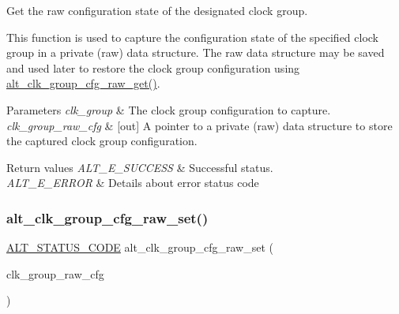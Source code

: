 Get the raw configuration state of the designated clock group.

This function is used to capture the configuration state of the specified clock group in a private (raw) data structure. The raw data structure may be saved and used later to restore the clock group configuration using \mbox{\hyperlink{group__CLK__MGR__GROUP__CFG_ga8bcf8cd04e2eddface10a7a0dd6f7b3d}{alt\+\_\+clk\+\_\+group\+\_\+cfg\+\_\+raw\+\_\+get()}}.


\begin{DoxyParams}{Parameters}
{\em clk\+\_\+group} & The clock group configuration to capture.\\
\hline
{\em clk\+\_\+group\+\_\+raw\+\_\+cfg} & \mbox{[}out\mbox{]} A pointer to a private (raw) data structure to store the captured clock group configuration.\\
\hline
\end{DoxyParams}

\begin{DoxyRetVals}{Return values}
{\em A\+L\+T\+\_\+\+E\+\_\+\+S\+U\+C\+C\+E\+SS} & Successful status. \\
\hline
{\em A\+L\+T\+\_\+\+E\+\_\+\+E\+R\+R\+OR} & Details about error status code \\
\hline
\end{DoxyRetVals}
\mbox{\label{group__CLK__MGR__GROUP__CFG_ga760bdf4144b1cab6a00c712268c29ef0}} 
\subsubsection{\texorpdfstring{alt\_clk\_group\_cfg\_raw\_set()}{alt\_clk\_group\_cfg\_raw\_set()}}
{\footnotesize\ttfamily \mbox{\hyperlink{hwlib_8h_abdb0d369f069723ca55d6c94bcaaaa12}{A\+L\+T\+\_\+\+S\+T\+A\+T\+U\+S\+\_\+\+C\+O\+DE}} alt\+\_\+clk\+\_\+group\+\_\+cfg\+\_\+raw\+\_\+set (\begin{DoxyParamCaption}\item[{const \mbox{\hyperlink{alt__clock__group_8h_aa160da43d5fe69a1f50985e94e199b54}{A\+L\+T\+\_\+\+C\+L\+K\+\_\+\+G\+R\+O\+U\+P\+\_\+\+R\+A\+W\+\_\+\+C\+F\+G\+\_\+t}} $\ast$}]{clk\+\_\+group\+\_\+raw\+\_\+cfg }\end{DoxyParamCaption})}

